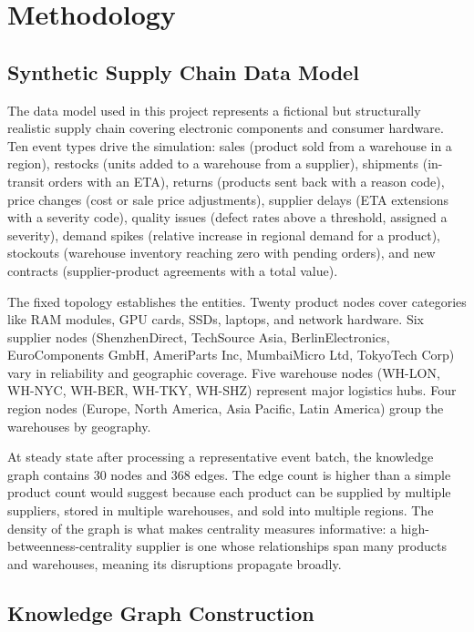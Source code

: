 \chapter{Methodology}
\label{ch:methodology}

\section{Synthetic Supply Chain Data Model}
\label{sec:data_model}

The data model used in this project represents a fictional but structurally realistic
supply chain covering electronic components and consumer hardware. Ten event types drive
the simulation: sales (product sold from a warehouse in a region), restocks (units added
to a warehouse from a supplier), shipments (in-transit orders with an ETA), returns
(products sent back with a reason code), price changes (cost or sale price adjustments),
supplier delays (ETA extensions with a severity code), quality issues (defect rates above
a threshold, assigned a severity), demand spikes (relative increase in regional demand
for a product), stockouts (warehouse inventory reaching zero with pending orders), and
new contracts (supplier-product agreements with a total value).

The fixed topology establishes the entities. Twenty product nodes cover categories like
RAM modules, GPU cards, SSDs, laptops, and network hardware. Six supplier nodes
(ShenzhenDirect, TechSource Asia, BerlinElectronics, EuroComponents GmbH, AmeriParts Inc,
MumbaiMicro Ltd, TokyoTech Corp) vary in reliability and geographic coverage. Five
warehouse nodes (WH-LON, WH-NYC, WH-BER, WH-TKY, WH-SHZ) represent major logistics
hubs. Four region nodes (Europe, North America, Asia Pacific, Latin America) group the
warehouses by geography.

At steady state after processing a representative event batch, the knowledge graph
contains 30 nodes and 368 edges. The edge count is higher than a simple product count
would suggest because each product can be supplied by multiple suppliers, stored in
multiple warehouses, and sold into multiple regions. The density of the graph is what
makes centrality measures informative: a high-betweenness-centrality supplier is one
whose relationships span many products and warehouses, meaning its disruptions propagate
broadly.

\section{Knowledge Graph Construction}
\label{sec:graph_construction}

